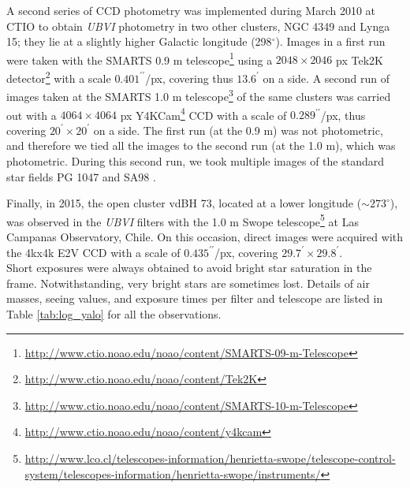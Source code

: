 \documentclass[draft]{aa}
\begin{document}
A second series of CCD photometry was implemented during March 2010 at CTIO
to obtain \textit{UBVI} photometry in two other clusters,
NGC 4349 and Lynga 15; they lie at a slightly higher Galactic longitude 
(298$^\circ$). Images in a first run were taken with the
SMARTS 0.9 m telescope\footnote{
\url{http://www.ctio.noao.edu/noao/content/SMARTS-09-m-Telescope}}
using a $2048\times2046$ px Tek2K
detector\footnote{\url{http://www.ctio.noao.edu/noao/content/Tek2K}} with a
scale $0.401^{\prime\prime}$/px, covering thus $13.6^{\prime}$ on a side. A
second run of images taken at the SMARTS 1.0 m telescope\footnote{
\url{http://www.ctio.noao.edu/noao/content/SMARTS-10-m-Telescope}}
of the same clusters was carried out with a $4064\times4064$ px
Y4KCam\footnote{\url{http://www.ctio.noao.edu/noao/content/y4kcam}}
CCD with a scale of $0.289^{\prime\prime}$/px, thus covering
$20^\prime\times20^\prime$ on a side.
%
The first run (at the 0.9 m) was not photometric, and therefore we tied all
the images to the second run (at the 1.0 m), which was photometric. During
this second run, we took multiple images of the standard star fields PG 1047
and SA98 \citep{1992AJ....104..340L}.

Finally, in 2015, the open cluster vdBH 73, located at a lower
longitude ($\sim 273^\circ$), was observed in the \textit{UBVI} filters with the
1.0 m Swope telescope\footnote{\url{http://www.lco.cl/telescopes-information/henrietta-swope/telescope-control-system/telescopes-information/henrietta-swope/instruments/}}
at Las Campanas Observatory, Chile. On this occasion,
direct images were acquired with the 4kx4k E2V CCD with a scale of
$0.435^{\prime\prime}$/px, covering $29.7^\prime\times29.8^\prime$.\\

Short exposures were always obtained to avoid bright star saturation in the
frame. Notwithstanding, very bright stars are sometimes lost.
Details of air masses, seeing values, and exposure times per filter and
telescope are listed in Table \ref{tab:log_yalo} for all the observations.

\end{document}
